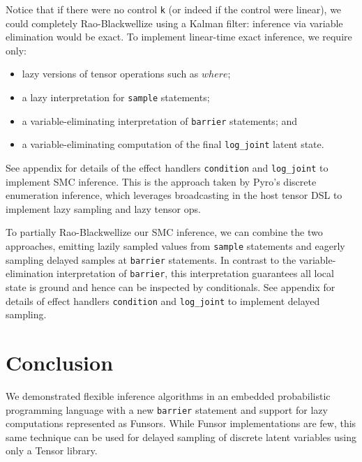 \documentclass[anonymous=false, %
               format=acmsmall, %
               review=true, %
               screen=true, %
               nonacm=true]{acmart}
\begin{document}
Notice that if there were no control \verb$k$ (or indeed if the control were linear), we could completely Rao-Blackwellize using a Kalman filter: inference via variable elimination would be exact.
To implement linear-time exact inference, we require only:
\begin{itemize}
  \item lazy versions of tensor operations such as $where$;
  \item a lazy interpretation for \verb$sample$ statements;
  \item a variable-eliminating interpretation of \verb$barrier$ statements; and
  \item a variable-eliminating computation of the final \verb$log_joint$ latent state.
\end{itemize}
See appendix \label{sec:appendix:exact} for details of the effect handlers \verb$condition$ and \verb$log_joint$ to implement SMC inference.
This is the approach taken by Pyro's discrete enumeration inference, which leverages broadcasting in the host tensor DSL to implement lazy sampling and lazy tensor ops.

To partially Rao-Blackwellize our SMC inference, we can combine the two approaches, emitting lazily sampled values from \verb$sample$ statements and eagerly sampling delayed samples at \verb$barrier$ statements.
In contrast to the variable-elimination interpretation of \verb$barrier$, this interpretation guarantees all local state is ground and hence can be inspected by conditionals.
See appendix \label{sec:appendix:delayed} for details of effect handlers \verb$condition$ and \verb$log_joint$ to implement delayed sampling.

\section{Conclusion}

We demonstrated flexible inference algorithms in an embedded probabilistic programming language with a new \verb$barrier$ statement and support for lazy computations represented as Funsors.
While Funsor implementations are few, this same technique can be used for delayed sampling of discrete latent variables using only a Tensor library.




\end{document}
